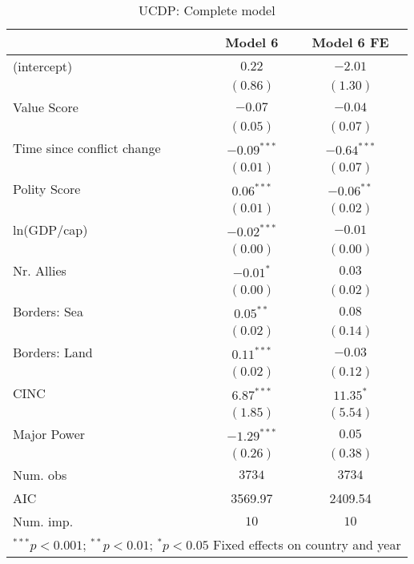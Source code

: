 
\begin{table}
\begin{center}
\begin{tabular}{l c c}
\toprule
 & Model 6 & Model 6 FE \\
\midrule
(intercept)                & $0.22$        & $-2.01$       \\
                           & $(0.86)$      & $(1.30)$      \\
Value Score                & $-0.07$       & $-0.04$       \\
                           & $(0.05)$      & $(0.07)$      \\
Time since conflict change & $-0.09^{***}$ & $-0.64^{***}$ \\
                           & $(0.01)$      & $(0.07)$      \\
Polity Score               & $0.06^{***}$  & $-0.06^{**}$  \\
                           & $(0.01)$      & $(0.02)$      \\
ln(GDP/cap)                & $-0.02^{***}$ & $-0.01$       \\
                           & $(0.00)$      & $(0.00)$      \\
Nr. Allies                 & $-0.01^{*}$   & $0.03$        \\
                           & $(0.00)$      & $(0.02)$      \\
Borders: Sea               & $0.05^{**}$   & $0.08$        \\
                           & $(0.02)$      & $(0.14)$      \\
Borders: Land              & $0.11^{***}$  & $-0.03$       \\
                           & $(0.02)$      & $(0.12)$      \\
CINC                       & $6.87^{***}$  & $11.35^{*}$   \\
                           & $(1.85)$      & $(5.54)$      \\
Major Power                & $-1.29^{***}$ & $0.05$        \\
                           & $(0.26)$      & $(0.38)$      \\
\midrule
Num. obs                   & $3734$        & $3734$        \\
AIC                        & 3569.97       & 2409.54       \\
Num. imp.                  & $10$          & $10$          \\
\bottomrule
\multicolumn{3}{l}{\scriptsize{$^{***}p<0.001$; $^{**}p<0.01$; $^{*}p<0.05$ 
 Fixed effects on country and year}}
\end{tabular}
\caption{UCDP: Complete model}
\label{UCDP_3}
\end{center}
\end{table}

